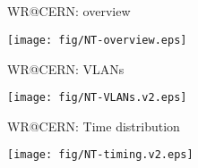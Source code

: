 \documentclass[compress,red]{beamer}
\begin{document}
\subsection{}
\begin{frame}{WR@CERN: overview}


      \begin{center}
	\texttt{[image: fig/NT-overview.eps]}
      \end{center}  

\end{frame}
\begin{frame}{WR@CERN: VLANs}

      \begin{center}
	\texttt{[image: fig/NT-VLANs.v2.eps]}
      \end{center}  

\end{frame}
\begin{frame}{WR@CERN: Time distribution}


      \begin{center}
	\texttt{[image: fig/NT-timing.v2.eps]}
      \end{center}  

\end{frame}
\end{document}
